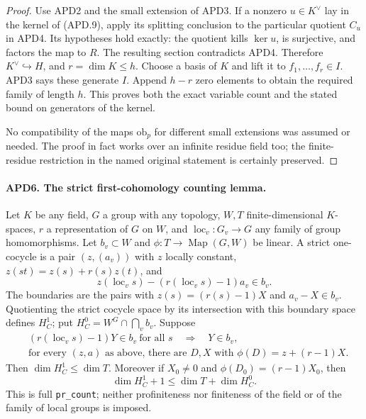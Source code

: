 \documentclass[11pt,a4paper]{article}
\numberwithin{equation}{section}
\theoremstyle{remark}\newtheorem{remark}[theorem]{Remark}
\begin{document}
\begin{proof}
Use APD2 and the small extension of APD3.  If a nonzero
\(u\in K^\vee\) lay in the kernel of (APD.9), apply its
splitting conclusion to the particular quotient \(C_u\) in
APD4.  Its hypotheses hold exactly: the quotient kills
\(\ker u\), is surjective, and factors the map to \(R\).
The resulting section contradicts APD4.  Therefore
\(K^\vee\hookrightarrow H\), and
\(r=\dim K\le h\).  Choose a basis of \(K\) and lift it
to \(f_1,\ldots,f_r\in I\).  APD3 says these generate
\(I\).  Append \(h-r\) zero elements to obtain the required
family of length \(h\).  This proves both the exact variable
count and the stated bound on generators of the kernel.

No compatibility of the maps \(\mathrm{ob}_p\) for different
small extensions was assumed or needed.  The proof in fact works
over an infinite residue field too; the finite-residue restriction
in the named original statement is certainly preserved.
\end{proof}

\paragraph{APD6. The strict first-cohomology counting lemma.}
\label{claim:APD6}
Let \(K\) be any field, \(G\) a group with any topology,
\(W,T\) finite-dimensional \(K\)-spaces, \(r\) a
representation of \(G\) on \(W\), and
\(\operatorname{loc}_v:G_v\to G\) any family of group
homomorphisms.  Let \(b_v\subset W\) and
\(\phi:T\to\operatorname{Map}(G,W)\) be linear.  A strict
one-cocycle is a pair \((z,(a_v))\) with \(z\) locally
constant, \(z(st)=z(s)+r(s)z(t)\), and
\[
 z(\operatorname{loc}_v s)-(r(\operatorname{loc}_v s)-1)a_v
                                                        \in b_v.
                                                               \tag{APD.11}
\]
The boundaries are the pairs with \(z(s)=(r(s)-1)X\) and
\(a_v-X\in b_v\).  Quotienting the strict cocycle space by
its intersection with this boundary space defines \(H^1_C\); put
\(H^0_C=W^G\cap\bigcap_v b_v\).
Suppose
\[
 \begin{split}
 &(r(\operatorname{loc}_v s)-1)Y\in b_v\ \text{for all }s
                         \quad\Longrightarrow\quad Y\in b_v,\\
 &\text{for every }(z,a)\text{ as above, there are }D,X
        \text{ with }\phi(D)=z+(r-1)X.
 \end{split}                                                  \tag{APD.12}
\]
Then \(\dim H^1_C\le\dim T\).  Moreover if
\(X_0\ne0\) and \(\phi(D_0)=(r-1)X_0\), then
\[
           \dim H^1_C+1\le\dim T+\dim H^0_C.                 \tag{APD.13}
\]
This is full \texttt{pr\_\allowbreak count}; neither profiniteness nor
finiteness of the field or of the family of local groups is imposed.
\end{document}
